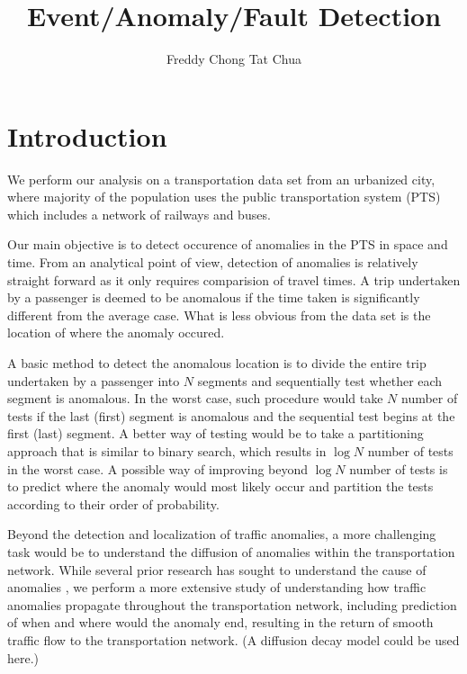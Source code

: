 \documentclass[10pt]{article}
\begin{document}
\author{Freddy Chong Tat Chua}
\title{Event/Anomaly/Fault Detection}

\maketitle

\section{Introduction}

We perform our analysis on a transportation data set from an urbanized city, where majority of the population uses the public transportation system (PTS) which includes a network of railways and buses. 

Our main objective is to detect occurence of anomalies in the PTS in space and time. From an analytical point of view, detection of anomalies is relatively straight forward as it only requires comparision of travel times. A trip undertaken by a passenger is deemed to be anomalous if the time taken is significantly different from the average case. What is less obvious from the data set is the location of where the anomaly occured.

A basic method to detect the anomalous location is to divide the entire trip undertaken by a passenger into $N$ segments and sequentially test whether each segment is anomalous. In the worst case, such procedure would take $N$ number of tests if the last (first) segment is anomalous and the sequential test begins at the first (last) segment. A better way of testing would be to take a partitioning approach that is similar to binary search, which results in $\log N$ number of tests in the worst case. A possible way of improving beyond $\log N$ number of tests is to predict where the anomaly would most likely occur and partition the tests according to their order of probability.

Beyond the detection and localization of traffic anomalies, a more challenging task would be to understand the diffusion of anomalies within the transportation network. While several prior research has sought to understand the cause of anomalies \cite{Chawla2012,Liu2011}, we perform a more extensive study of understanding how traffic anomalies propagate throughout the transportation network, including prediction of when and where would the anomaly end, resulting in the return of smooth traffic flow to the transportation network. (A diffusion decay model could be used here.)
\end{document}
